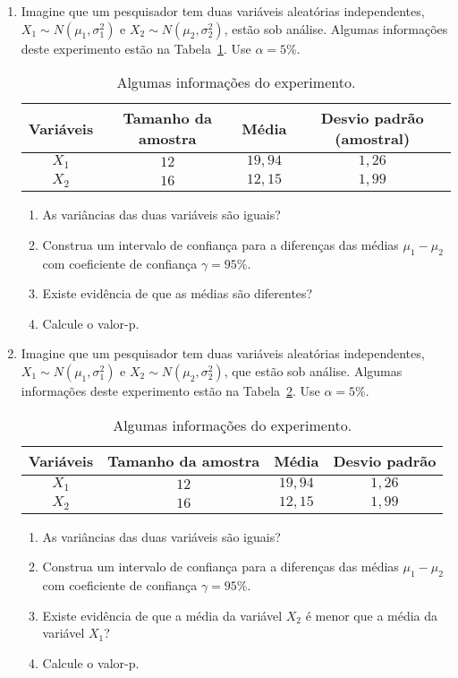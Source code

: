 \documentclass[8pt, a4paper]{article}
\begin{document}
\begin{enumerate}
	\item Imagine que um pesquisador tem duas variáveis aleatórias independentes, $X_1 \sim N(\mu_1, \sigma^2_1)$ e $X_2 \sim N(\mu_2, \sigma_2^2)$, estão sob análise.  Algumas informações deste experimento estão na Tabela~\ref{tab:m1-m2-dif-bilateral}. Use $\alpha=5\%$.
	\begin{table}[htbp]
		\centering
		\begin{tabular}{c|c|c|c}
			\toprule[0.05cm]
			Variáveis & Tamanho da amostra & Média & Desvio padrão (amostral) \\ \midrule[0.025cm]
			$X_1$ & $12$ & $19,94$ & $1,26$ \\ \midrule[0.025cm]
			$X_2$ & $16$ & $12,15$ & $1,99$ \\ \bottomrule[0.05cm]
		\end{tabular}
		\caption{Algumas informações do experimento.}
		\label{tab:m1-m2-dif-bilateral}
	\end{table}
	\begin{enumerate}
		\item As variâncias das duas variáveis são iguais? 
		\item Construa um intervalo de confiança para a diferenças das médias $\mu_1 - \mu_2$ com coeficiente de confiança $\gamma=95\%$.
		\item Existe evidência de que as médias são diferentes?
		\item Calcule o valor-p.
	\end{enumerate}

	\item Imagine que um pesquisador tem duas variáveis aleatórias independentes, $X_1 \sim N(\mu_1, \sigma^2_1)$ e $X_2 \sim N(\mu_2, \sigma_2^2)$, que estão sob análise.  Algumas informações deste experimento estão na Tabela~\ref{tab:m1-m2-dif-unilateral-h1-lower}. Use $\alpha=5\%$.
	\begin{table}[htbp]
		\centering
		\begin{tabular}{c|c|c|c}
			\toprule[0.05cm]
			Variáveis & Tamanho da amostra & Média & Desvio padrão \\ \midrule[0.025cm]
			$X_1$ & $12$ & $19,94$ & $1,26$ \\ \midrule[0.025cm]
			$X_2$ & $16$ & $12,15$ & $1,99$ \\ \bottomrule[0.05cm]
		\end{tabular}
		\caption{Algumas informações do experimento.}
		\label{tab:m1-m2-dif-unilateral-h1-lower}
	\end{table}
	\begin{enumerate}
		\item As variâncias das duas variáveis são iguais? 
		\item Construa um intervalo de confiança para a diferenças das médias $\mu_1 - \mu_2$ com coeficiente de confiança $\gamma=95\%$.
		\item Existe evidência de que a média da variável $X_2$ é menor que a média da variável $X_1$?
		\item Calcule o valor-p.
	\end{enumerate}	


\end{enumerate}
\end{document}
